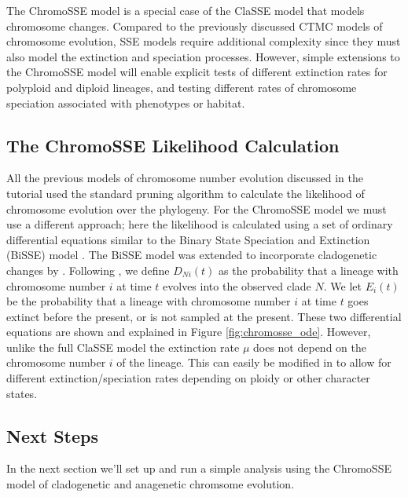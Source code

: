 The ChromoSSE model \citep{freyman2016cladogenetic}
is a special case of the ClaSSE model that models chromosome
changes.
Compared to the previously discussed CTMC models of chromosome evolution,
SSE models require additional complexity since they must also
model the extinction and speciation processes.
However, simple extensions to the ChromoSSE model will enable explicit 
tests of different extinction rates for polyploid and diploid lineages,
and testing different rates of chromosome speciation associated with phenotypes or habitat.

\subsection{The ChromoSSE Likelihood Calculation}

All the previous models of chromosome number evolution discussed in the tutorial used
the standard pruning algorithm \citep{felsenstein81} to calculate
the likelihood of chromosome evolution over the phylogeny.
For the ChromoSSE model we must use a different approach;
here the likelihood is calculated using a set of ordinary differential
equations similar to the
Binary State Speciation and Extinction (BiSSE) model \citep{maddison2007estimating}.
The BiSSE model was extended to incorporate cladogenetic changes
by \citet{goldberg2012tempo}.
Following \citet{goldberg2012tempo}, we define
$D_{Ni}(t)$ as the probability that a lineage with
chromosome number $i$ at time $t$ evolves into the observed clade $N$.
We let $E_i(t)$ be the probability that a lineage
with chromosome number $i$ at time $t$ goes extinct before the present, or is not sampled at the present.
These two differential equations are shown and explained in Figure \ref{fig:chromosse_ode}.
However, unlike the full ClaSSE model the
extinction rate $\mu$ does not depend on the
chromosome number $i$ of the lineage.
This can easily be modified in \RevBayes to allow for different extinction/speciation rates
depending on ploidy or other character states.


\subsection{Next Steps}


In the next section we'll set up and run a simple \RevBayes analysis using the ChromoSSE model
of cladogenetic and anagenetic chromsome evolution.


\newpage
